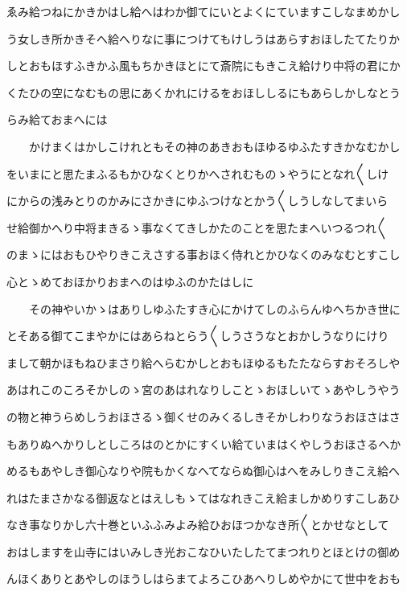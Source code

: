\documentclass[a4paper,11pt,landscape]{ltjtarticle}
\begin{document}
ゑみ給つねにかきかはし給へはわか御てにいとよくにていますこしなまめかし
\par\medskip
う女しき所かきそへ給へりなに事につけてもけしうはあらすおほしたてたりか
\par\medskip
しとおもほすふきかふ風もちかきほとにて斎院にもきこえ給けり中将の君にか
\par\medskip
くたひの空になむもの思にあくかれにけるをおほししるにもあらしかしなとう
\par\medskip
らみ給ておまへには
\par\medskip
　　かけまくはかしこけれともその神のあきおもほゆるゆふたすきかなむかし
\par\medskip
をいまにと思たまふるもかひなくとりかへされむものゝやうにとなれ〱しけ
\par\medskip
にからの浅みとりのかみにさかきにゆふつけなとかう〱しうしなしてまいら
\par\medskip
せ給御かへり中将まきるゝ事なくてきしかたのことを思たまへいつるつれ〱
\par\medskip
のまゝにはおもひやりきこえさする事おほく侍れとかひなくのみなむとすこし
\par\medskip
心とゝめておほかりおまへのはゆふのかたはしに
\par\medskip
　　その神やいかゝはありしゆふたすき心にかけてしのふらんゆへちかき世に
\par\medskip
とそある御てこまやかにはあらねとらう〱しうさうなとおかしうなりにけり
\par\medskip
まして朝かほもねひまさり給へらむかしとおもほゆるもたたならすおそろしや
\par\medskip
あはれこのころそかしのゝ宮のあはれなりしことゝおほしいてゝあやしうやう
\par\medskip
の物と神うらめしうおほさるゝ御くせのみくるしきそかしわりなうおほさはさ
\par\medskip
もありぬへかりしとしころはのとかにすくい給ていまはくやしうおほさるへか
\par\medskip
めるもあやしき御心なりや院もかくなへてならぬ御心はへをみしりきこえ給へ
\par\medskip
れはたまさかなる御返なとはえしもゝてはなれきこえ給ましかめりすこしあひ
\par\medskip
なき事なりかし六十巻といふふみよみ給ひおほつかなき所〱とかせなとして
\par\medskip
おはしますを山寺にはいみしき光おこなひいたしたてまつれりとほとけの御め
\par\medskip
んほくありとあやしのほうしはらまてよろこひあへりしめやかにて世中をおも
\par\medskip
\end{document}
